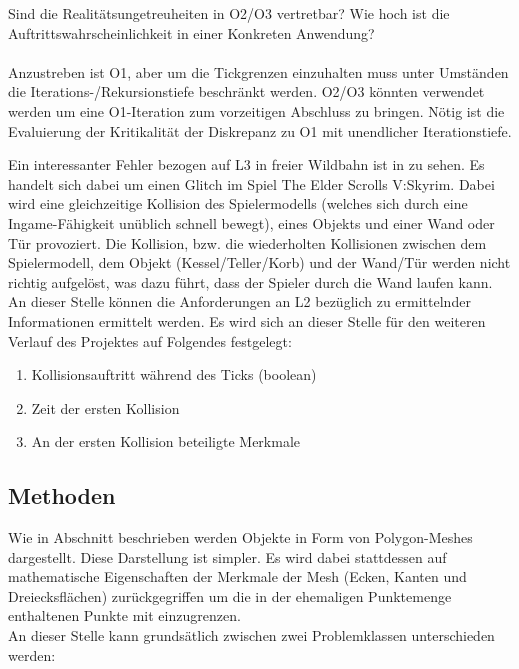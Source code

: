 Sind die Realitätsungetreuheiten in O2/O3 vertretbar? Wie hoch ist die Auftrittswahrscheinlichkeit in einer Konkreten Anwendung?\\
\\
Anzustreben ist O1, aber um die Tickgrenzen einzuhalten muss unter Umständen die Iterations-/Rekursionstiefe beschränkt werden. O2/O3 könnten verwendet werden um eine O1-Iteration zum vorzeitigen Abschluss zu bringen. Nötig ist die Evaluierung der Kritikalität der Diskrepanz zu O1 mit unendlicher Iterationstiefe.
 
Ein interessanter Fehler bezogen auf L3 in freier Wildbahn ist in \cite{skyrimwallglitch} zu sehen. Es handelt sich dabei um einen Glitch im Spiel The Elder Scrolls V:Skyrim. Dabei wird eine gleichzeitige Kollision des Spielermodells (welches sich durch eine Ingame-Fähigkeit unüblich schnell bewegt), eines Objekts und einer Wand oder Tür provoziert. Die Kollision, bzw. die wiederholten Kollisionen zwischen dem Spielermodell, dem Objekt (Kessel/Teller/Korb) und der Wand/Tür werden nicht richtig aufgelöst, was dazu führt, dass der Spieler durch die Wand laufen kann.\\

An dieser Stelle können die Anforderungen an L2 bezüglich zu ermittelnder Informationen ermittelt werden. Es wird sich an dieser Stelle für den weiteren Verlauf des Projektes auf Folgendes festgelegt:
\begin{enumerate}
	\item Kollisionsauftritt während des Ticks (boolean)
	\item Zeit der ersten Kollision
	\item An der ersten Kollision beteiligte Merkmale
\end{enumerate}









\subsection{Methoden}

Wie in Abschnitt \label{sec:l0_objects} beschrieben werden Objekte in Form von Polygon-Meshes dargestellt. Diese Darstellung ist simpler. Es wird dabei stattdessen auf mathematische Eigenschaften der Merkmale der Mesh (Ecken, Kanten und Dreiecksflächen) zurückgegriffen um die in der ehemaligen Punktemenge enthaltenen Punkte mit einzugrenzen.\\
An dieser Stelle kann grundsätlich zwischen zwei Problemklassen unterschieden werden:

